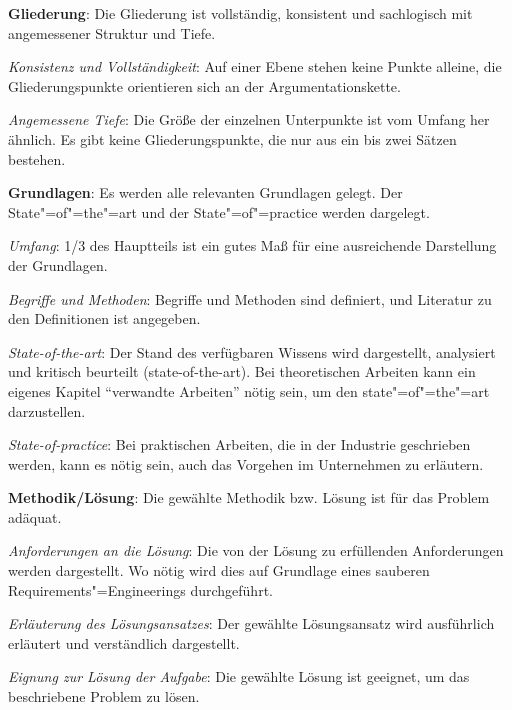 \begin{checklist}
  \footnotesize
  \item \textbf{Gliederung}: Die Gliederung ist vollständig, konsistent und sachlogisch mit angemessener Struktur und Tiefe.
    \begin{checklist}
        \item \textit{Konsistenz und Vollständigkeit}: Auf einer Ebene stehen keine Punkte alleine, die Gliederungspunkte orientieren sich an der Argumentationskette.
        \item \textit{Angemessene Tiefe}: Die Größe der einzelnen Unterpunkte ist vom Umfang her ähnlich. Es gibt keine Gliederungspunkte, die nur aus ein bis zwei Sätzen bestehen.
    \end{checklist}
  \item \textbf{Grundlagen}: Es werden alle relevanten Grundlagen gelegt. Der State"=of"=the"=art und der State"=of"=practice werden dargelegt.
    \begin{checklist}
        \item \textit{Umfang}: 1/3 des Hauptteils ist ein gutes Maß für eine ausreichende Darstellung der Grundlagen.
        \item \textit{Begriffe und Methoden}: Begriffe und Methoden sind definiert, und Literatur zu den Definitionen ist angegeben.
        \item \textit{State-of-the-art}: Der Stand des verfügbaren Wissens wird dargestellt, analysiert und kritisch beurteilt (state-of-the-art). Bei theoretischen Arbeiten kann ein eigenes Kapitel \enquote{verwandte Arbeiten} nötig sein, um den state"=of"=the"=art darzustellen.
        \item \textit{State-of-practice}: Bei praktischen Arbeiten, die in der Industrie geschrieben werden, kann es nötig sein, auch das Vorgehen im Unternehmen zu erläutern.
    \end{checklist}
  \item \textbf{Methodik/Lösung}: Die gewählte Methodik bzw. Lösung ist für das Problem adäquat.
    \begin{checklist}
        \item \textit{Anforderungen an die Lösung}: Die von der Lösung zu erfüllenden Anforderungen werden dargestellt. Wo nötig wird dies auf Grundlage eines sauberen Requirements"=Engineerings durchgeführt.
        \item \textit{Erläuterung des Lösungsansatzes}: Der gewählte Lösungsansatz wird ausführlich erläutert und verständlich dargestellt.
        \item \textit{Eignung zur Lösung der Aufgabe}: Die gewählte Lösung ist geeignet, um das beschriebene Problem zu lösen.

\end{checklist}
\end{checklist}
